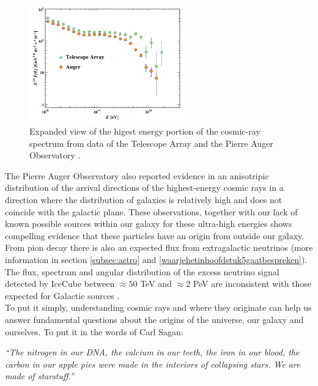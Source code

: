 \begin{figure}
\centering
\includegraphics[width=0.6\textwidth]{chapter3/img/ankle.png}
\caption{Expanded view of the higest energy portion of the cosmic-ray spectrum from data of the Telescope Array and the Pierre Auger Observatory \cite{pdg2018}.}
\label{fig:ankle}
\end{figure}
The Pierre Auger Observatory also reported evidence in an anisotripic distribution of the arrival directions of the highest-energy cosmic rays \cite{Aab:2017tyv} in a direction where the distribution of galaxies is relatively high and does not coincide with the galactic plane. These observations, together with our lack of known possible sources within our galaxy for these ultra-high energies shows compelling evidence that these particles have an origin from outside our galaxy. From pion decay there is also an expected flux from extragalactic neutrinos (more information in section \ref{subsec:astro} and \ref{waarjehetinhoofdstuk5gaatbespreken}). The flux, spectrum and angular distribution of the excess neutrino signal detected by IceCube between $\approx 50$ TeV and $\approx 2$ PeV are inconsistent with those expected for Galactic sources \cite{Waxman:2013zda}.\\
\newline
To put it simply, understanding cosmic rays and where they originate can help us answer fundamental questions about the origins of the universe, our galaxy and ourselves. To put it in the words of Carl Sagan:

\begin{center}
\begin{minipage}[5cm]{0.9\textwidth}
\textit{``The nitrogen in our DNA, the calcium in our teeth, the iron in our blood, the carbon in our apple pies were made in the interiors of collapsing stars. We are made of starstuff.''}
\end{minipage}
\end{center}

